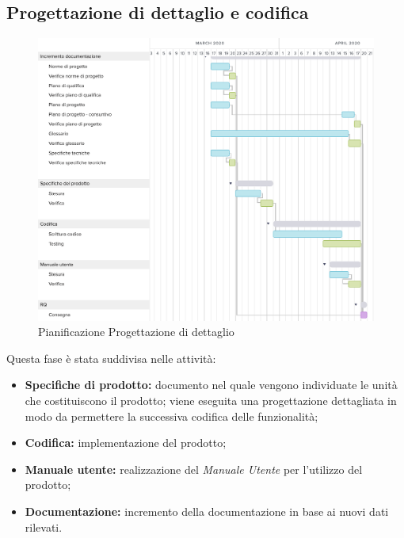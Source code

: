 \subsection{Progettazione di dettaglio e codifica}
\begin{figure}[h!]
	\includegraphics[width=\textwidth]{res/img/g4}
	\caption{Pianificazione Progettazione di dettaglio}
\end{figure}
\noindent Questa fase è stata suddivisa nelle attività:
\begin{itemize}
	\item \textbf{Specifiche di prodotto:} documento nel quale vengono individuate le unità che costituiscono il prodotto; viene eseguita una progettazione dettagliata in modo da permettere la successiva codifica delle funzionalità;
	\item  \textbf{Codifica:} implementazione del prodotto;
	\item \textbf{Manuale utente:} realizzazione del \textit{Manuale Utente} per l'utilizzo del prodotto;
	\item \textbf{Documentazione:} incremento della documentazione in base ai nuovi dati rilevati.
\end{itemize}

